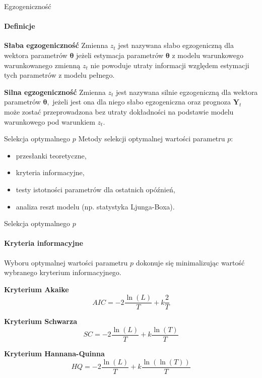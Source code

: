 \documentclass[a4paper, 11pt]{beamer}
\begin{document}
	\begin{frame}{Egzogeniczność}
		\framesubtitle{Definicje}
		
		\begin{block}{\textbf{Słaba egzogeniczność}}
			Zmienna $z_t$ jest nazywana słabo egzogeniczną dla wektora parametrów
			$\boldsymbol{\theta}$ jeżeli estymacja parametrów $\boldsymbol{\theta}$
			z modelu warunkowego warunkowanego zmienną $z_t$ nie powoduje utraty
			informacji względem estymacji tych parametrów z modelu pełnego.
		\end{block}
		
		\begin{block}{\textbf{Silna egzogeniczność}}
			Zmienna $z_t$ jest nazywana silnie egzogeniczną dla wektora parametrów
			$\boldsymbol{\theta},$ jeżeli jest ona dla niego słabo egzogeniczna oraz
			prognoza $\boldsymbol{Y}_t$ może zostać przeprowadzona bez utraty
			dokładności na podstawie modelu warunkowego pod warunkiem $z_t.$
		\end{block}
		
	\end{frame}

	\begin{frame}{Selekcja optymalnego $p$}
		Metody selekcji optymalnej wartości parametru $p:$
		\begin{itemize}
			\item przesłanki teoretyczne,
			\item kryteria informacyjne,
			\item testy istotności parametrów dla ostatnich opóźnień,
			\item analiza reszt modelu (np. statystyka Ljunga-Boxa).
		\end{itemize}
	\end{frame}
	
	\begin{frame}{Selekcja optymalnego $p$}
		\framesubtitle{Kryteria informacyjne}
		Wyboru optymalnej wartości parametru $p$ dokonuje się 
		minimalizując wartość wybranego kryterium informacyjnego.
		\begin{block}{\textbf{Kryterium Akaike}}
			\[
				AIC =
					-2\frac{\ln\left(L\right)}{T} + 
					k\frac{2}{T}
			\]
		\end{block}
		\begin{block}{\textbf{Kryterium Schwarza}}
			\[
				SC =
					-2\frac{\ln\left(L\right)}{T} +
					k \frac{\ln\left(T\right)}{T}
			\]
		\end{block}
		\begin{block}{\textbf{Kryterium Hannana-Quinna}}
			\[
				HQ = 
					-2\frac{\ln\left(L\right)}{T} +
					k \frac{\ln\left(\ln\left(T\right)\right)}{T}
			\]
		\end{block}
	\end{frame}
\end{document}
